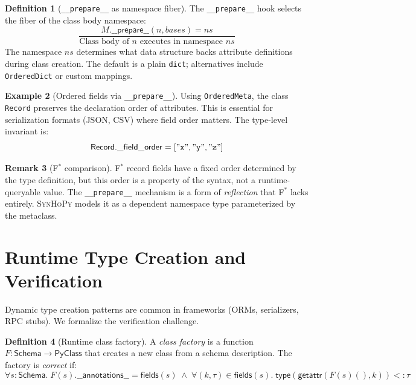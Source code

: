 \documentclass[11pt,a4paper]{report}
\theoremstyle{definition}
\newtheorem{definition}{Definition}[chapter]
\newtheorem{example}[definition]{Example}
\newtheorem{remark}[definition]{Remark}
\theoremstyle{plain}
\newcommand{\PyClass}{\mathsf{PyClass}}
\newcommand{\fstar}{F$^{*}$}
\newcommand{\synhopy}{\textsc{SynHoPy}}
\begin{document}
\begin{definition}[\texttt{\_\_prepare\_\_} as namespace fiber]
\label{def:prepare}
The \lstinline[style=python]{__prepare__} hook selects the fiber of the
class body namespace:
\[
  \frac{
    M.\mathsf{\_\_prepare\_\_}(n, \mathit{bases}) = \mathit{ns}
  }{
    \text{Class body of } n \text{ executes in namespace } \mathit{ns}
  }
\]
The namespace $\mathit{ns}$ determines what data structure backs attribute
definitions during class creation.  The default is a plain
\lstinline[style=python]{dict}; alternatives include
\lstinline[style=python]{OrderedDict} or custom mappings.
\end{definition}

\begin{example}[Ordered fields via \texttt{\_\_prepare\_\_}]
Using \lstinline[style=python]{OrderedMeta}, the class
\lstinline[style=python]{Record} preserves the declaration order of
attributes.  This is essential for serialization formats (JSON, CSV)
where field order matters.  The type-level invariant is:
\[
  \mathsf{Record}.\mathsf{\_field\_order} =
    [\mathtt{"x"}, \mathtt{"y"}, \mathtt{"z"}]
\]
\end{example}

\begin{remark}[\fstar{} comparison]
\fstar{} record fields have a fixed order determined by the type definition,
but this order is a property of the syntax, not a runtime-queryable value.
The \lstinline[style=python]{__prepare__} mechanism is a form of
\emph{reflection} that \fstar{} lacks entirely.  \synhopy{} models it as
a dependent namespace type parameterized by the metaclass.
\end{remark}

\section{Runtime Type Creation and Verification}

Dynamic type creation patterns are common in frameworks (ORMs, serializers,
RPC stubs).  We formalize the verification challenge.

\begin{definition}[Runtime class factory]
\label{def:class-factory}
A \emph{class factory} is a function
$F : \mathsf{Schema} \to \PyClass$ that creates a new class from a
schema description.  The factory is \emph{correct} if:
\[
  \forall s : \mathsf{Schema}.\;
    F(s).\mathsf{\_\_annotations\_\_} = \mathsf{fields}(s)
    \;\wedge\;
    \forall (k, \tau) \in \mathsf{fields}(s).\;
      \mathsf{type}(\mathsf{getattr}(F(s)(), k)) <: \tau
\]
\end{definition}
\end{document}
